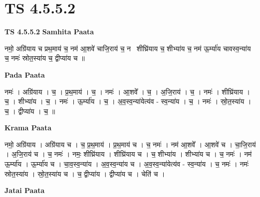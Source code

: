 \documentclass[17pt]{extarticle}
\begin{document}
\section{ TS 4.5.5.2 }

\textbf{TS 4.5.5.2 } \newline
\textbf{Samhita Paata} \newline

नमो॒ अग्रि॑याय च प्रथ॒माय॑ च॒ नम॑ आ॒शवे॑ चाजि॒राय॑ च॒ नमः᳡शीघ्रि॑याय च॒ शीभ्या॑य च॒ नम॑ ऊ॒र्म्या॑य चावस्व॒न्या॑य च॒ नमः॑ स्रोत॒स्या॑य च॒ द्वीप्या॑य च ॥ \newline

\textbf{Pada Paata} \newline

नमः॑ । अग्रि॑याय । च॒ । प्र॒थ॒माय॑ । च॒ । नमः॑ । आ॒शवे᳚ । च॒ । अ॒जि॒राय॑ । च॒ । नमः॑ । शीघ्रि॑याय । च॒ । शीभ्या॑य । च॒ । नमः॑ । ऊ॒र्म्या॑य । च॒ । अ॒व॒स्व॒न्या॑येत्य॑व - स्व॒न्या॑य । च॒ । नमः॑ । स्रो॒त॒स्या॑य । च॒ । द्वीप्या॑य । च॒ ॥  \newline


\textbf{Krama Paata} \newline

नमो॒ अग्रि॑याय । अग्रि॑याय च । च॒ प्र॒थ॒माय॑ । प्र॒थ॒माय॑ च । च॒ नमः॑ । नम॑ आ॒शवे᳚ । आ॒शवे॑ च । चा॒जि॒राय॑ । अ॒जि॒राय॑ च । च॒ नमः॑ । नमः॒ शीघ्रि॑याय । शीघ्रि॑याय च । च॒ शीभ्या॑य । शीभ्या॑य च । च॒ नमः॑ । नम॑ ऊ॒र्म्या॑य । ऊ॒र्म्या॑य च । चा॒व॒स्व॒न्या॑य । अ॒व॒स्व॒न्या॑य च । अ॒व॒स्व॒न्या॑येत्य॑व - स्व॒न्या॑य । च॒ नमः॑ । नमः॑ स्रोत॒स्या॑य । स्रो॒त॒स्या॑य च । च॒ द्वीप्या॑य । द्वीप्या॑य च । चेति॑ च । \newline

\textbf{Jatai Paata} \newline
\end{document}
